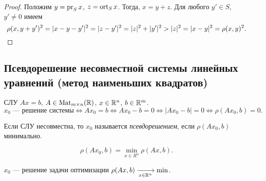 \begin{proof}
    Положим $y = \operatorname{\mathop{\mathrm{pr}}}_S x$, $z = \operatorname{\mathop{\mathrm{ort}}}_S x$. Тогда, $x = y + z$.
    Для любого $y' \in S$, $y' \neq 0$ имеем
    \begin{equation*}
        \rho(x, y + y')^2 = |x - y - y'|^2 = |z - y'|^2 = |z|^2 + |y'|^2 > |z|^2 = |x - y|^2 = \rho(x, y)^2
    .\qedhere\end{equation*}
\end{proof}


\subsection{Псевдорешение несовместной системы линейных уравнений (метод наименьших квадратов)}

СЛУ $Ax = b$, $A \in \text{Mat}_{m \times n}(\mathbb{R})$, $x \in \mathbb{R}^n$, $b \in \mathbb{R}^m$.
\begin{equation*}
    x_0 \text{ --- решение системы} \iff Ax_0 = b \iff Ax_0 - b = 0 \iff |Ax_0 - b| = 0 \iff \rho(Ax_0, b) = 0
.\end{equation*}

Если СЛУ несовместна, то $x_0$ называется \textit{псевдорешением}, если $\rho(Ax_0, b)$ минимально.

\begin{equation*}
    \rho(Ax_0, b) = \min_{x \in R^n} \rho(Ax, b)
.\end{equation*}

$x_0$ --- решение задачи оптимизации $\rho(Ax, b) \xrightarrow[x \in \mathbb{R}^n]{} \min$.
